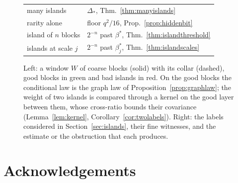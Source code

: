 \documentclass[11pt]{amsart}
\theoremstyle{definition}
\theoremstyle{remark}
\numberwithin{equation}{section}
\begin{document}
\begin{figure}[t]
\begin{minipage}[c]{0.52\textwidth}
\begin{tabular}{@{}ll@{}}
many islands & $\varDelta_*$, Thm.~\ref{thm:manyislands}\\
rarity alone & floor $q^2/16$, Prop.~\ref{prop:hiddenbit}\\
island of $n$ blocks & $2^{-n}$ past $\beta^*$, Thm.~\ref{thm:islandthreshold}\\
islands at scale $j$ & $2^{-n}$ past $\beta^*_j$, Thm.~\ref{thm:islandscales}\\
\bottomrule
\end{tabular}
\end{minipage}
\caption{Left: a window $W$ of coarse blocks (solid) with its collar
(dashed), good blocks in green and bad islands in red. On the good blocks
the conditional law is the graph law of Proposition~\ref{prop:graphlaw};
the weight of two islands is compared through a kernel on the good layer
between them, whose cross-ratio bounds their covariance
(Lemma~\ref{lem:kernel}, Corollary~\ref{cor:twolabels}). Right: the labels
considered in Section~\ref{sec:islands}, their fine witnesses, and the
estimate or the obstruction that each produces.}
\label{fig:islands}
\end{figure}

\section*{Acknowledgements}
\end{document}
